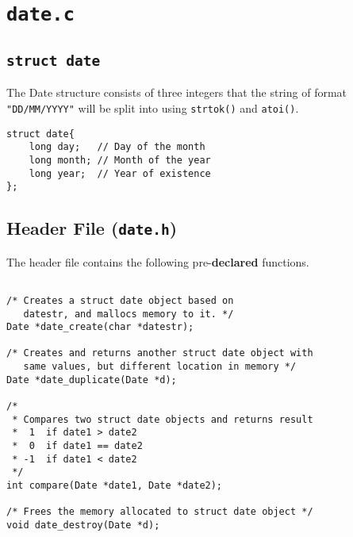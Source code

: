 \documentclass{article}
\newcommand{\code}[1]{\texttt{#1}}
\begin{document}

\newpage

\section{\code{date.c}}

\vspace{0.5cm}

\subsection{\code{struct date}}
The Date structure consists of three integers that the string of format\\ \code{"DD/MM/YYYY"} will be split into using \code{strtok()} and \code{atoi()}.

\begin{verbatim}
struct date{
    long day;   // Day of the month
    long month; // Month of the year
    long year;  // Year of existence
};
\end{verbatim}

\vspace{1cm}

\subsection{Header File (\code{date.h})}
The header file contains the following pre-\textbf{declared} functions.

\begin{verbatim}

/* Creates a struct date object based on
   datestr, and mallocs memory to it. */
Date *date_create(char *datestr);

/* Creates and returns another struct date object with
   same values, but different location in memory */
Date *date_duplicate(Date *d);

/* 
 * Compares two struct date objects and returns result
 *  1  if date1 > date2
 *  0  if date1 == date2
 * -1  if date1 < date2
 */
int compare(Date *date1, Date *date2);

/* Frees the memory allocated to struct date object */
void date_destroy(Date *d);
\end{verbatim}


\end{document}
